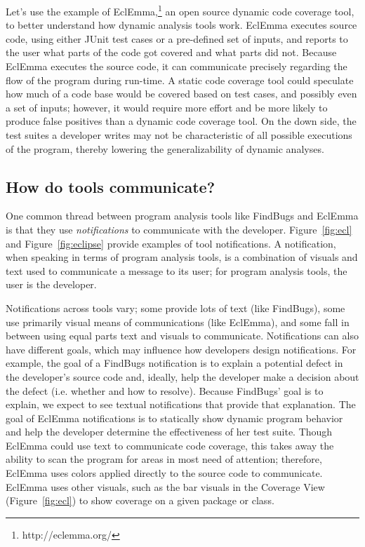 \documentclass{llncs}
\begin{document}
Let's use the example of EclEmma,\footnote{http://eclemma.org/} an open source dynamic code coverage tool, to better understand how dynamic analysis tools work. EclEmma executes source code, using either JUnit test cases or a pre-defined set of inputs, and reports to the user what parts of the code got covered and what parts did not. Because EclEmma executes the source code, it can communicate precisely regarding the flow of the program during run-time. A static code coverage tool could speculate how much of a code base would be covered based on test cases, and possibly even a set of inputs; however, it would require more effort and be more likely to produce false positives than a dynamic code coverage tool. On the down side, the test suites a developer writes may not be characteristic of all possible executions of the program, thereby lowering the generalizability of dynamic analyses.

\subsection{How do tools communicate?}\label{subsec:comm}

One common thread between program analysis tools like FindBugs and EclEmma is that they use \emph{notifications} to communicate with the developer. Figure~\ref{fig:ecl} and Figure~\ref{fig:eclipse} provide examples of tool notifications. A notification, when speaking in terms of program analysis tools, is a combination of visuals and text used to communicate a message to its user; for program analysis tools, the user is the developer.

Notifications across tools vary; some provide lots of text (like FindBugs), some use primarily visual means of communications (like EclEmma), and some fall in between using equal parts text and visuals to communicate. Notifications can also have different goals, which may influence how developers design notifications. For example, the goal of a FindBugs notification is to explain a potential defect in the developer's source code and, ideally, help the developer make a decision about the defect (i.e. whether and how to resolve). Because FindBugs' goal is to explain, we expect to see textual notifications that provide that explanation.
The goal of EclEmma notifications is to statically show dynamic program behavior and help the developer determine the effectiveness of her test suite. Though EclEmma could use text to communicate code coverage, this takes away the ability to scan the program for areas in most need of attention; therefore, EclEmma uses colors applied directly to the source code to communicate. EclEmma uses other visuals, such as the bar visuals in the Coverage View (Figure~\ref{fig:ecl}) to show coverage on a given package or class.
\end{document}
